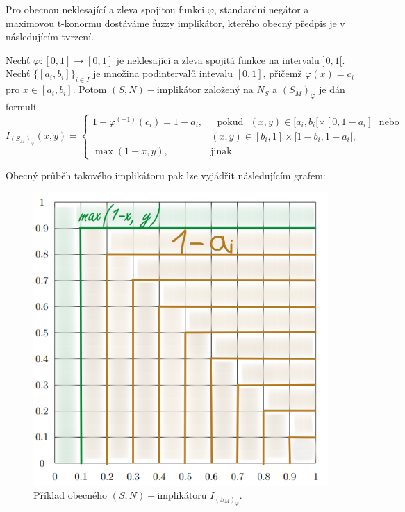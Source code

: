 Pro obecnou neklesající a zleva spojitou funkci $\varphi$, standardní negátor a maximovou t-konormu dostáváme fuzzy implikátor, kterého obecný předpis je v následujícím tvrzení.
\begin{sentence}
\cite{mitav}
\label{sn-impl}
       Nechť $\varphi:[0,1]\rightarrow [0,1]$
je neklesající a zleva spojitá funkce na intervalu $]0,1[$.
Nechť
$\{[a_i,b_i]\}_{i\in I}$ je množina podintervalů intevalu $[0,1]$, přičemž $\varphi(x)=c_i$ pro $x\in
[a_i,b_i]$.
Potom $(S,N)-$implikátor založený na $N_S$ a $(S_M)_{\varphi}$ je dán formulí
$$ I_{(S_M)_{\varphi}}(x,y) = \begin{cases} 1-\varphi^{(-1)}(c_i)=1-a_i, &\mbox {~~pokud~~}
(x,y)\in [a_i,b_i[\times[0,1-a_i] \mbox{~~nebo~~}
\\ & (x,y)\in [b_i,1]\times[1-b_i,1-a_i[,
\\ \max(1-x,y), &\mbox {jinak.}
\end{cases} $$

\end{sentence}

Obecný průběh takového implikátoru pak lze vyjádřit následujícím grafem:

\begin{figure}[H]
    \caption{Příklad obecného $(S,N)-$implikátoru $I_{(S_M)_{\varphi}}$.}
        \hspace{-1cm}
        \includegraphics[scale=0.5]{template-fig/sn-implphi.PNG}
        \centering
\end{figure}

